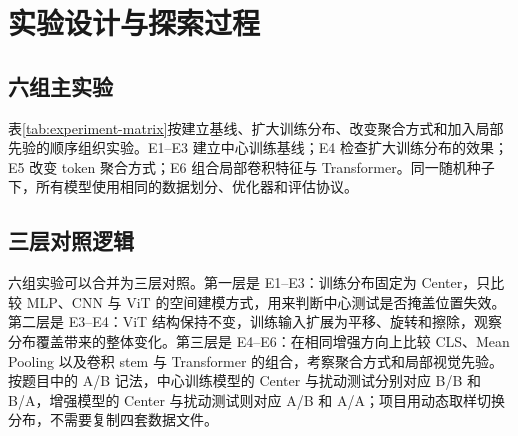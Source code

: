 \section{实验设计与探索过程}

\subsection{六组主实验}

表\ref{tab:experiment-matrix}按建立基线、扩大训练分布、改变聚合方式和加入局部先验的顺序组织实验。E1--E3 建立中心训练基线；E4 检查扩大训练分布的效果；E5 改变 token 聚合方式；E6 组合局部卷积特征与 Transformer。同一随机种子下，所有模型使用相同的数据划分、优化器和评估协议。

\begin{table}[H]
  \centering
  \caption{主实验矩阵及各实验回答的问题}
  \label{tab:experiment-matrix}
\end{table}

\subsection{三层对照逻辑}

六组实验可以合并为三层对照。第一层是 E1--E3：训练分布固定为 Center，只比较 MLP、CNN 与 ViT 的空间建模方式，用来判断中心测试是否掩盖位置失效。第二层是 E3--E4：ViT 结构保持不变，训练输入扩展为平移、旋转和擦除，观察分布覆盖带来的整体变化。第三层是 E4--E6：在相同增强方向上比较 CLS、Mean Pooling 以及卷积 stem 与 Transformer 的组合，考察聚合方式和局部视觉先验。按题目中的 A/B 记法，中心训练模型的 Center 与扰动测试分别对应 B/B 和 B/A，增强模型的 Center 与扰动测试则对应 A/B 和 A/A；项目用动态取样切换分布，不需要复制四套数据文件。

